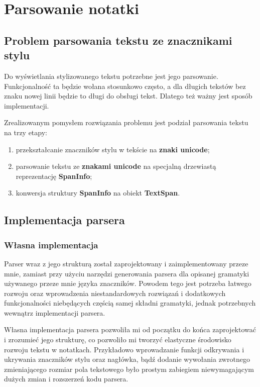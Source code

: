 \section{Parsowanie notatki}

\subsection{Problem parsowania tekstu ze znacznikami stylu}

Do wyświetlania stylizowanego tekstu potrzebne jest jego parsowanie. Funkcjonalność ta będzie wołana stosunkowo często, a dla długich tekstów bez znaku nowej linii będzie to długi do obsługi tekst. Dlatego też ważny jest sposób implementacji.

Zrealizowanym pomysłem rozwiązania problemu jest podział parsowania tekstu na trzy etapy:
\begin{enumerate}
    \setlength\itemsep{0mm}
    \item przekształcanie znaczników stylu w tekście na \textbf{znaki unicode};
    \item parsowanie tekstu ze \textbf{znakami unicode} na specjalną drzewiastą reprezentację \textbf{SpanInfo};
    \item konwersja struktury \textbf{SpanInfo} na obiekt \textbf{TextSpan}.
\end{enumerate}

\subsection{Implementacja parsera}

\subsubsection{Własna implementacja}

Parser wraz z jego strukturą został zaprojektowany i zaimplementowany przeze mnie, zamiast przy użyciu narzędzi generowania parsera dla opisanej gramatyki używanego przeze mnie języka znaczników. Powodem tego jest potrzeba łatwego rozwoju oraz wprowadzenia niestandardowych rozwiązań i dodatkowych funkcjonalności niebędących częścią samej składni gramatyki, jednak potrzebnych wewnątrz implementacji parsera.

Własna implementacja parsera pozwoliła mi od początku do końca zaprojektować i zrozumieć jego strukturę, co pozwoliło mi tworzyć elastyczne środowisko rozwoju tekstu w notatkach. Przykładowo wprowadzanie funkcji odkrywania i ukrywania znaczników stylu oraz nagłówka, bądź dodanie wywołania zwrotnego zmieniającego rozmiar pola tekstowego było prostym zabiegiem niewymagającym dużych zmian i rozszerzeń kodu parsera.

